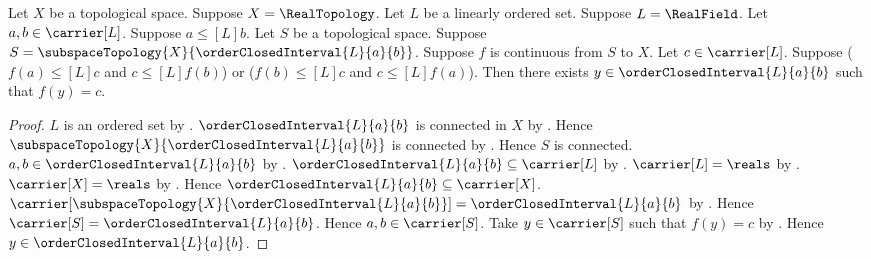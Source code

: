 \begin{corollary}\label{real_closed_interval_intermediate_value}
    Let $X$ be a topological space.
    Suppose $X=\RealTopology$.
    Let $L$ be a linearly ordered set.
    Suppose $L=\RealField$.
    Let $a,b\in\carrier[L]$.
    Suppose $a\mathrel{\leq[L]}b$.
    Let $S$ be a topological space.
    Suppose
        $S=\subspaceTopology{X}{\orderClosedInterval{L}{a}{b}}$.
    Suppose $f$ is continuous from $S$ to $X$.
    Let $c\in\carrier[L]$.
    Suppose
        ($f(a)\mathrel{\leq[L]}c$ and
            $c\mathrel{\leq[L]}f(b)$) or
        ($f(b)\mathrel{\leq[L]}c$ and
            $c\mathrel{\leq[L]}f(a)$).
    Then there exists $y\in\orderClosedInterval{L}{a}{b}$ such that
        $f(y)=c$.
\end{corollary}
\begin{proof}
    $L$ is an ordered set by
        .
    $\orderClosedInterval{L}{a}{b}$ is connected in $X$ by
        .
    Hence
        $\subspaceTopology{X}{\orderClosedInterval{L}{a}{b}}$
        is connected by .
    Hence $S$ is connected.
    $a,b\in\orderClosedInterval{L}{a}{b}$ by
        .
    $\orderClosedInterval{L}{a}{b}\subseteq\carrier[L]$ by
        .
    $\carrier[L]=\reals$ by
        .
    $\carrier[X]=\reals$ by .
    Hence
        $\orderClosedInterval{L}{a}{b}\subseteq\carrier[X]$.
    $\carrier[\subspaceTopology{X}
        {\orderClosedInterval{L}{a}{b}}]
        =\orderClosedInterval{L}{a}{b}$ by
        .
    Hence $\carrier[S]=\orderClosedInterval{L}{a}{b}$.
    Hence $a,b\in\carrier[S]$.
    Take $y\in\carrier[S]$ such that $f(y)=c$ by
        .
    Hence $y\in\orderClosedInterval{L}{a}{b}$.
\end{proof}
